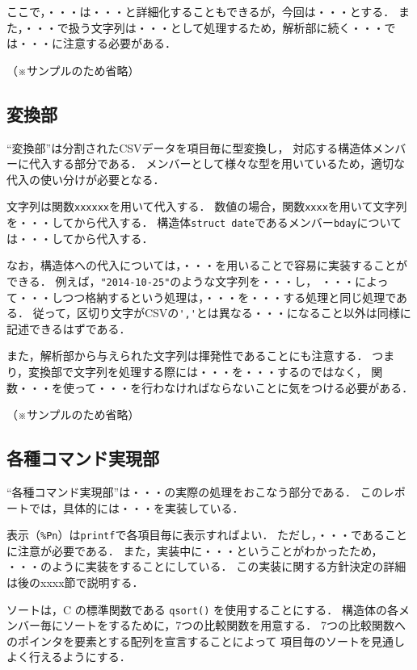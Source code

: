 \documentclass[a4j,11pt]{jarticle}
\begin{document}
ここで，・・・は・・・と詳細化することもできるが，今回は・・・とする．
また，・・・で扱う文字列は・・・として処理するため，解析部に続く・・・では・・・に注意する必要がある．

（※サンプルのため省略）

\subsection{変換部}

``変換部''は分割されたCSVデータを項目毎に型変換し，
対応する構造体メンバーに代入する部分である．
メンバーとして様々な型を用いているため，適切な代入の使い分けが必要となる．

文字列は関数\verb|xxxxxx|を用いて代入する．
数値の場合，関数\verb|xxxx|を用いて文字列を・・・してから代入する．
構造体\verb|struct date|であるメンバー\verb|bday|については・・・してから代入する．

なお，構造体への代入については，・・・を用いることで容易に実装することができる．
例えば，\verb|"2014-10-25"|のような文字列を・・・し，
・・・によって・・・しつつ格納するという処理は，・・・を・・・する処理と同じ処理である．
従って，区切り文字がCSVの\verb|','|とは異なる・・・になること以外は同様に記述できるはずである．

また，解析部から与えられた文字列は揮発性であることにも注意する．
つまり，変換部で文字列を処理する際には・・・を・・・するのではなく，
関数・・・を使って・・・を行わなければならないことに気をつける必要がある．

（※サンプルのため省略）

\subsection{各種コマンド実現部}

``各種コマンド実現部''は・・・の実際の処理をおこなう部分である．
このレポートでは，具体的には・・・を実装している．

表示（\verb|%Pn|）は\verb|printf|で各項目毎に表示すればよい．
ただし，・・・であることに注意が必要である．
また，実装中に・・・ということがわかったため，
・・・のように実装をすることにしている．
この実装に関する方針決定の詳細は後のxxxx節で説明する．

ソートは，C の標準関数である \verb|qsort()| を使用することにする．
構造体の各メンバー毎にソートをするために，7つの比較関数を用意する．
7つの比較関数へのポインタを要素とする配列を宣言することによって
項目毎のソートを見通しよく行えるようにする．
\end{document}
